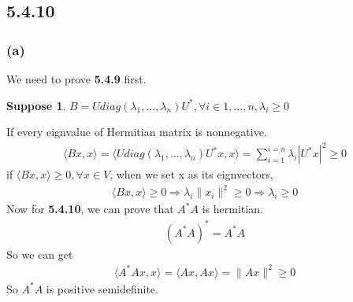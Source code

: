 \documentclass{article}
\newtheorem*{suppose}{Suppose}
\begin{document}
\subsection*{5.4.10}
\subsubsection*{(a)}
We need to prove \textbf{5.4.9} first. 
\begin{suppose}
    $B = Udiag(\lambda_1, ..., \lambda_n)U^*, \forall i \in {1, ..., n}, \lambda_i \ge 0$
\end{suppose}
If every eignvalue of Hermitian matrix is nonnegative.
\begin{equation*}
    \begin{split}
        \langle Bx, x \rangle = \langle Udiag(\lambda_1, ..., \lambda_n)U^* x,x\rangle = \sum_{i = 1}^{i = n} \lambda_i | U^*x|^2 \ge 0
    \end{split}
\end{equation*}
if $\langle Bx, x \rangle \ge 0, \forall x \in V$, when we set x as its eignvectors, 
\begin{equation*}
    \begin{split}
        \langle Bx, x \rangle \ge 0 \Rightarrow \lambda_i\|x_i\|^2 \ge 0 \Rightarrow \lambda_i \ge 0
    \end{split}
\end{equation*} 
Now for \textbf{5.4.10}, we can prove that $A^*A$ is hermitian.
\begin{equation*}
    \begin{split}
        (A^*A)^* = A^*A
    \end{split}
\end{equation*}
So we can get \begin{equation*}
    \begin{split}
        \langle A^*Ax, x \rangle = \langle Ax, Ax \rangle = \|Ax\|^2 \ge 0
    \end{split}
\end{equation*}
So $A^*A$ is positive semidefinite.
\end{document}
